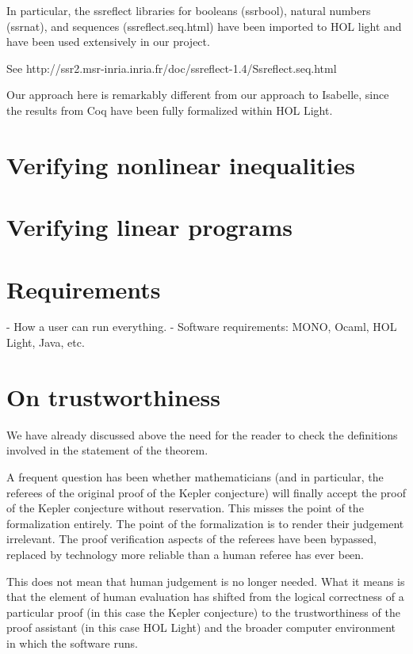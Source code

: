 In particular, the ssreflect libraries for booleans (ssrbool), natural numbers (ssrnat), and sequences (ssreflect.seq.html)
have been imported to HOL light and
have been used extensively in our project.

See http://ssr2.msr-inria.inria.fr/doc/ssreflect-1.4/Ssreflect.seq.html

Our approach here is remarkably different from our approach to Isabelle, since the results from Coq have been fully
formalized within HOL Light. 


\section{Verifying nonlinear inequalities}

\section{Verifying linear programs}

\section{Requirements}

- How a user can run everything.
- Software requirements: MONO, Ocaml, HOL Light, Java, etc.


\section{On trustworthiness}

We have already discussed above the need for the reader to check the definitions involved in the statement of the theorem.

A frequent question has been whether mathematicians (and in particular, the referees of the original proof of the Kepler conjecture)
will finally accept the proof of the Kepler conjecture without reservation.  This misses the point of the formalization entirely.
The point of the formalization is to render their judgement irrelevant.  The proof verification aspects of the referees 
have been bypassed, replaced by technology
more reliable than a human referee has ever been.

This does not mean that human judgement is no longer needed.  What it means is that the element of human evaluation has shifted from
the logical correctness of a particular proof (in this case the Kepler conjecture) to the trustworthiness of the proof assistant
(in this case HOL Light) and the broader computer environment in which the software runs.


